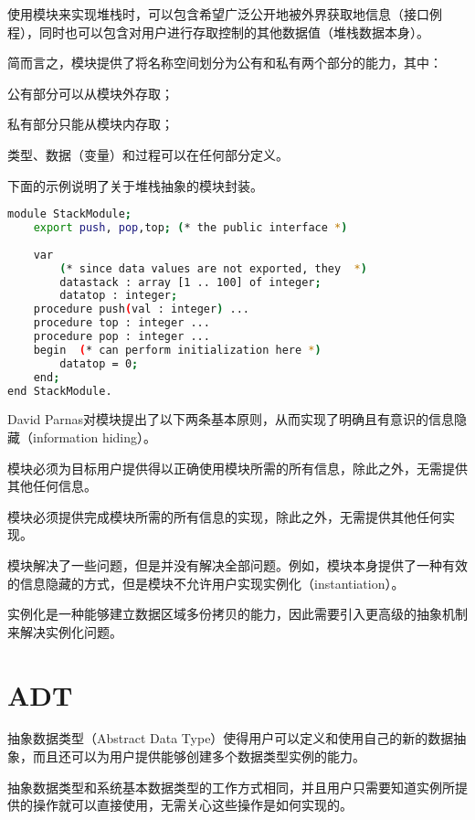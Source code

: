 使用模块来实现堆栈时，可以包含希望广泛公开地被外界获取地信息（接口例程），同时也可以包含对用户进行存取控制的其他数据值（堆栈数据本身）。

简而言之，模块提供了将名称空间划分为公有和私有两个部分的能力，其中：

\begin{compactitem}
\item 公有部分可以从模块外存取；
\item 私有部分只能从模块内存取；
\item 类型、数据（变量）和过程可以在任何部分定义。
\end{compactitem}

下面的示例说明了关于堆栈抽象的模块封装。

\begin{lstlisting}[language=bash]
module StackModule;
	export push, pop,top; (* the public interface *)
	
	var
		(* since data values are not exported, they  *)
		datastack : array [1 .. 100] of integer;
		datatop : integer;
	procedure push(val : integer) ...
	procedure top : integer ...
	procedure pop : integer ...
	begin  (* can perform initialization here *)
		datatop = 0;
	end;
end StackModule.
\end{lstlisting}

David Parnas对模块提出了以下两条基本原则，从而实现了明确且有意识的信息隐藏（information hiding）。

\begin{compactenum}
\item 模块必须为目标用户提供得以正确使用模块所需的所有信息，除此之外，无需提供其他任何信息。
\item 模块必须提供完成模块所需的所有信息的实现，除此之外，无需提供其他任何实现。
\end{compactenum}

模块解决了一些问题，但是并没有解决全部问题。例如，模块本身提供了一种有效的信息隐藏的方式，但是模块不允许用户实现实例化（instantiation）。

实例化是一种能够建立数据区域多份拷贝的能力，因此需要引入更高级的抽象机制来解决实例化问题。

\section{ADT}

抽象数据类型（Abstract Data Type）使得用户可以定义和使用自己的新的数据抽象，而且还可以为用户提供能够创建多个数据类型实例的能力。

抽象数据类型和系统基本数据类型的工作方式相同，并且用户只需要知道实例所提供的操作就可以直接使用，无需关心这些操作是如何实现的。

